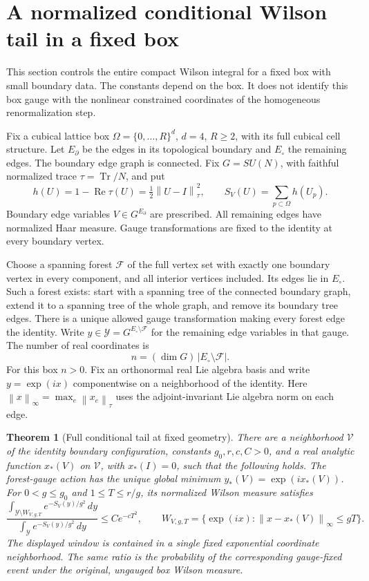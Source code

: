 \documentclass[11pt]{article}
\newcommand{\norm}[1]{\left\lVert#1\right\rVert}
\newtheorem{theorem}{Theorem}[section]
\theoremstyle{remark}
\begin{document}
\section{A normalized conditional Wilson tail in a fixed box}
\label{fbw:section}

This section controls the entire compact Wilson integral for a fixed
box with small boundary data. The constants depend on the box. It
does not identify this box gauge with the nonlinear constrained
coordinates of the homogeneous renormalization step.

Fix a cubical lattice box \(\Omega=\{0,\ldots,R\}^d\), \(d=4\),
\(R\geq2\), with its full cubical cell structure. Let \(E_\partial\)
be the edges in its topological boundary and \(E_\circ\) the remaining
edges. The boundary edge graph is connected. Fix
\(G=SU(N)\), with faithful normalized trace \(\tau=\operatorname{Tr}/N\),
and put
\[
 h(U)=1-\operatorname{Re}\tau(U)
     =\tfrac12\norm{U-I}_\tau^2,\qquad
 S_V(U)=\sum_{p\subset\Omega}h(U_p).
\]
Boundary edge variables \(V\in G^{E_\partial}\) are prescribed.
All remaining edges have normalized Haar measure. Gauge transformations
are fixed to the identity at every boundary vertex.

Choose a spanning forest \(\mathcal F\) of the full vertex set with
exactly one boundary vertex in every component, and all interior
vertices included. Its edges lie in \(E_\circ\). Such a forest exists:
start with a spanning tree of the connected boundary graph, extend
it to a spanning tree of the whole graph, and remove its boundary
tree edges. There is a unique allowed gauge transformation making
every forest edge the identity. Write \(y\in\mathcal Y=G^{E_\circ
\setminus\mathcal F}\) for the remaining edge variables in that gauge.
The number of real coordinates is
\[
 n=(\dim G)\,|E_\circ\setminus\mathcal F|.
\]
For this box \(n>0\). Fix an orthonormal real Lie algebra basis and
write \(y=\exp(ix)\) componentwise on a neighborhood of the identity.
Here \(\norm{x}_\infty=\max_e\norm{x_e}_\tau\) uses the
adjoint-invariant Lie algebra norm on each edge.

\begin{theorem}[Full conditional tail at fixed geometry]
\label{fbw:theorem}
There are a neighborhood \(\mathcal V\) of the identity boundary
configuration, constants \(g_0,r,c,C>0\), and a real analytic
function \(x_*(V)\) on \(\mathcal V\), with \(x_*(I)=0\), such that
the following holds. The forest-gauge action has the unique global
minimum \(y_*(V)=\exp(ix_*(V))\). For
\(0<g\leq g_0\) and \(1\leq T\leq r/g\), its normalized Wilson
measure satisfies
\begin{equation}
 \frac{\displaystyle
    \int_{\mathcal Y\setminus W_{V,g,T}}
           e^{-S_V(y)/g^2}\,dy}
      {\displaystyle\int_{\mathcal Y}e^{-S_V(y)/g^2}\,dy}
 \leq C e^{-cT^2},
 \qquad
 W_{V,g,T}=\{\exp(ix):\norm{x-x_*(V)}_\infty\leq gT\}.
 \label{fbw:tail}
\end{equation}
The displayed window is contained in a single fixed exponential
coordinate neighborhood. The same ratio is the probability of the
corresponding gauge-fixed event under the original, ungauged box
Wilson measure.
\end{theorem}
\end{document}
